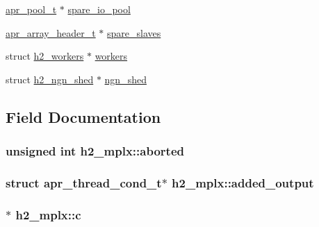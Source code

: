 \begin{DoxyCompactItemize}
\item 
\hyperlink{structapr__pool__t}{apr\+\_\+pool\+\_\+t} $\ast$ \hyperlink{structh2__mplx_af10ba5c49a10e718f95e9edb12a869b5}{spare\+\_\+io\+\_\+pool}
\item 
\hyperlink{structapr__array__header__t}{apr\+\_\+array\+\_\+header\+\_\+t} $\ast$ \hyperlink{structh2__mplx_ace4f37166fa7916c2a75300688a63e51}{spare\+\_\+slaves}
\item 
struct \hyperlink{structh2__workers}{h2\+\_\+workers} $\ast$ \hyperlink{structh2__mplx_a58bdd2bc9b732ee0c064c39fc9b75743}{workers}
\item 
struct \hyperlink{structh2__ngn__shed}{h2\+\_\+ngn\+\_\+shed} $\ast$ \hyperlink{structh2__mplx_ab9d2944dc8737d9f6f00c752fc0cef09}{ngn\+\_\+shed}
\end{DoxyCompactItemize}


\subsection{Field Documentation}
\subsubsection[{\texorpdfstring{aborted}{aborted}}]{\setlength{\rightskip}{0pt plus 5cm}unsigned {\bf int} h2\+\_\+mplx\+::aborted}\hypertarget{structh2__mplx_aa3ee90da5c50dc1eb7b05832be65abab}{}\label{structh2__mplx_aa3ee90da5c50dc1eb7b05832be65abab}
\subsubsection[{\texorpdfstring{added\+\_\+output}{added_output}}]{\setlength{\rightskip}{0pt plus 5cm}struct {\bf apr\+\_\+thread\+\_\+cond\+\_\+t}$\ast$ h2\+\_\+mplx\+::added\+\_\+output}\hypertarget{structh2__mplx_a8b38de7d091e8ce87dc76af576212fb4}{}\label{structh2__mplx_a8b38de7d091e8ce87dc76af576212fb4}
\subsubsection[{\texorpdfstring{c}{c}}]{$\ast$ h2\+\_\+mplx\+::c}\hypertarget{structh2__mplx_ac63918b573f120f457787754cd79f263}{}\label{structh2__mplx_ac63918b573f120f457787754cd79f263}
